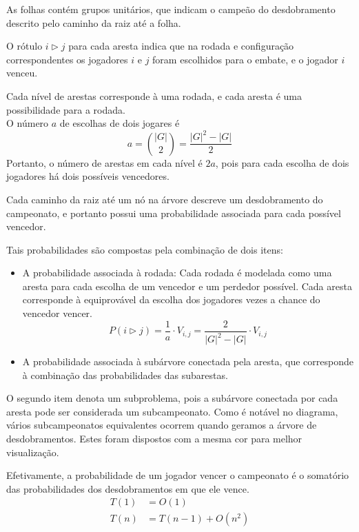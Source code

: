 \documentclass{article}
\begin{document}
\noindent As folhas contém grupos unitários, que indicam o campeão do desdobramento descrito pelo caminho da raiz até a folha.

\noindent O rótulo $i \triangleright j$ para cada aresta indica que na rodada e configuração correspondentes os jogadores $i$ e $j$ foram escolhidos para o embate, e o jogador $i$ venceu.

\noindent Cada nível de arestas corresponde à uma rodada, e cada aresta é uma possibilidade para a rodada. \\
O número $a$ de escolhas de dois jogares é
\begin{equation} \label{eq:combinations}
  a = \binom{|G|}{2} = \frac{{|G|}^2 - |G|}{2}
\end{equation}
Portanto, o número de arestas em cada nível é $2a$, pois para cada escolha de dois jogadores há dois possíveis vencedores.

\noindent Cada caminho da raiz até um nó na árvore descreve um desdobramento do campeonato, e portanto possui uma probabilidade associada para cada possível vencedor.

\pagebreak

\noindent Tais probabilidades são compostas pela combinação de dois itens:
\begin{itemize}
  \item A probabilidade associada à rodada: Cada rodada é modelada como uma aresta para cada escolha de um vencedor e um perdedor possível. Cada aresta corresponde à equiprovável da escolha dos jogadores vezes a chance do vencedor vencer.
    \[ P(i \triangleright j) = \frac{1}{a} \cdot V_{i,j} = \frac{2}{{|G|}^2 - |G|} \cdot V_{i,j} \]
  \item A probabilidade associada à subárvore conectada pela aresta, que corresponde à combinação das probabilidades das subarestas.
\end{itemize}

\noindent O segundo item denota um subproblema, pois a subárvore conectada por cada aresta pode ser considerada um subcampeonato. Como é notável no diagrama, vários subcampeonatos equivalentes ocorrem quando geramos a árvore de desdobramentos. Estes foram dispostos com a mesma cor para melhor visualização.

\noindent Efetivamente, a probabilidade de um jogador vencer o campeonato é o somatório das probabilidades dos desdobramentos em que ele vence.
\begin{align*}
  T(1) &= O(1) \\
  T(n) &= T(n-1) + O(n^2)
\end{align*}
\end{document}
